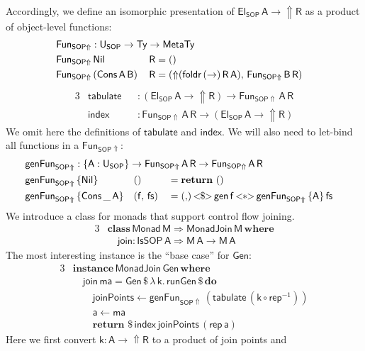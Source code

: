 \documentclass[acmsmall]{acmart}
\newcommand{\mit}[1]{{\mathsf{#1}}}
\newcommand{\msf}[1]{{\mathsf{#1}}}
\newcommand{\mbf}[1]{{\mathbf{#1}}}
\newcommand{\mdo}{\mbf{do}\,}
\newcommand{\ind}{\hspace{1em}}
\newcommand{\return}{\mbf{return}\,}
\newcommand{\lam}{\lambda\,}
\newcommand{\where}{\mbf{where}}
\newcommand{\vma}{\mathsf{ma}}
\newcommand{\vk}{\mathsf{k}}
\newcommand{\vA}{\mathsf{A}}
\newcommand{\vB}{\mathsf{B}}
\newcommand{\vR}{\mathsf{R}}
\newcommand{\vM}{\mathsf{M}}
\newcommand{\va}{\mathsf{a}}
\newcommand{\vf}{\mathsf{f}}
\newcommand{\vfs}{\mathsf{fs}}
\newcommand{\SOP}{\msf{SOP}}
\newcommand{\El}{\msf{El}}
\newcommand{\USOP}{\msf{U}_{\msf{SOP}}}
\newcommand{\IsSOP}{\msf{IsSOP}}
\newcommand{\Nil}{\msf{Nil}}
\newcommand{\Cons}{\msf{Cons}}
\newcommand{\Monad}{\msf{Monad}}
\newcommand{\fro}{\leftarrow}
\newcommand{\Lift}{{\Uparrow}}
\newcommand{\MTy}{\msf{MetaTy}}
\newcommand{\Ty}{\msf{Ty}}
\theoremstyle{remark}
\newcommand{\tyclass}{\mbf{class}}
\newcommand{\instance}{\mbf{instance}\,}
\newcommand{\Gen}{\msf{Gen}}
\newcommand{\gen}{\mit{gen}}
\newcommand{\fmap}{<\!\!\$\!\!>}
\newcommand{\ap}{{<\!\!*\!\!>}}
\newcommand{\runGen}{\mit{runGen}}
\newcommand{\RA}{\Rightarrow}
\newcommand{\dlr}{\,\$\,}
\newcommand{\MonadJoin}{\msf{MonadJoin}}
\newcommand{\join}{\mit{join}}
\newcommand{\mindex}{\mit{index}}
\newcommand{\mtabulate}{\mit{tabulate}}
\begin{document}
Accordingly, we define an isomorphic presentation of $\El_\SOP\,\vA \to
\Lift \vR$ as a product of object-level functions:
\begin{alignat*}{3}
  &\mathrlap{\mit{Fun}_{\SOP\Lift} : \USOP \to \Ty \to \MTy}\\
  &\mit{Fun}_{\SOP\Lift}\,\Nil\,&& \vR = ()\\
  &\mit{Fun}_{\SOP\Lift}\,(\Cons\,\vA\,\vB)\,&& \vR = (\Lift(\mit{foldr}\,(\to)\,\vR\,\vA),\,\mit{Fun}_{\SOP\Lift}\,\vB\,\vR)
\end{alignat*}
\begin{alignat*}{3}
  &\mtabulate &&: (\El_\SOP\,\vA \to \Lift \vR) \to \mit{Fun}_{\SOP\Lift}\,\vA\,\vR\\
  &\mindex    &&: \mit{Fun}_{\SOP\Lift}\,\vA\,\vR \to (\El_\SOP\,\vA \to \Lift \vR)
\end{alignat*}
We omit here the definitions of $\mtabulate$ and $\mindex$. We will also need to
let-bind all functions in a $\mit{Fun}_{\SOP\Lift}$:
\begin{alignat*}{3}
  & \mathrlap{\mit{genFun}_{\SOP\Lift} : \{\vA : \USOP\} \to \mit{Fun}_{\SOP\Lift}\,\vA\,\vR \to \mit{Fun}_{\SOP\Lift}\,\vA\,\vR}\\
  & \mit{genFun}_{\SOP\Lift}\,\{\Nil\}        && ()             &&= \return\,()\\
  & \mit{genFun}_{\SOP\Lift}\,\{\Cons\,\_\,\vA\}&& (\vf,\,\mit{\vfs}) &&= ({,})\,{\fmap}\,\gen\,\vf\,{\ap}\,\mit{genFun}_{\SOP\Lift}\,\{\vA\}\,\vfs
\end{alignat*}
We introduce a class for monads that support control flow joining.
\begin{alignat*}{3}
  & \tyclass\,\Monad\,\vM \RA \MonadJoin\,\vM\,\where\\
  & \ind \join : \IsSOP\,\vA \RA \vM\,\vA \to \vM\,\vA
\end{alignat*}
The most interesting instance is the ``base case'' for $\Gen$:
\begin{alignat*}{3}
  &\instance \MonadJoin\,\Gen\,\where\\
  &\ind \join\,\vma = \Gen \dlr \lam \vk.\,\runGen \dlr \mdo\\
  &\ind \ind \mit{joinPoints} \fro \mit{genFun}_{\SOP\Lift}\,(\mtabulate\,(\vk \circ \mit{rep}^{-1}))\\
  &\ind \ind \va \fro \vma\\
  &\ind \ind \return \dlr \mindex\,\mit{joinPoints}\,(\mit{rep}\,\va)
\end{alignat*}
Here we first convert $\vk : \vA \to \Lift \vR$ to a product of join points and
\end{document}
